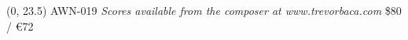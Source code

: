 \documentclass[10pt]{article}
\begin{document}
\begin{textblock}{23}(0, 23.5)
AWN-019 \hfill
\textit{Scores available from the composer at www.trevorbaca.com} \hfill
\$80 / \euro 72
\end{textblock}
\end{document}
